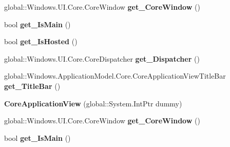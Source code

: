 \begin{DoxyCompactItemize}
global\+::\+Windows.\+U\+I.\+Core.\+Core\+Window {\bfseries get\+\_\+\+Core\+Window} ()
\item 
\mbox{\label{class_windows_1_1_application_model_1_1_core_1_1_core_application_view_ae303c87bc500fe45edef23e4dea23518}} 
bool {\bfseries get\+\_\+\+Is\+Main} ()
\item 
\mbox{\label{class_windows_1_1_application_model_1_1_core_1_1_core_application_view_a8dc7e59605e7f56708e128508f7cc977}} 
bool {\bfseries get\+\_\+\+Is\+Hosted} ()
\item 
\mbox{\label{class_windows_1_1_application_model_1_1_core_1_1_core_application_view_a9d7c8b64ee6c13bc8a8e92f9e48c4ccc}} 
global\+::\+Windows.\+U\+I.\+Core.\+Core\+Dispatcher {\bfseries get\+\_\+\+Dispatcher} ()
\item 
\mbox{\label{class_windows_1_1_application_model_1_1_core_1_1_core_application_view_a3019f6ab113ca8bc442c591f5cb35e5d}} 
global\+::\+Windows.\+Application\+Model.\+Core.\+Core\+Application\+View\+Title\+Bar {\bfseries get\+\_\+\+Title\+Bar} ()
\item 
\mbox{\label{class_windows_1_1_application_model_1_1_core_1_1_core_application_view_a7f2958bb867e52abb737c302fe562838}} 
{\bfseries Core\+Application\+View} (global\+::\+System.\+Int\+Ptr dummy)
\item 
\mbox{\label{class_windows_1_1_application_model_1_1_core_1_1_core_application_view_a7cfe4f4a49ed78d0ae11a16e6cebc507}} 
global\+::\+Windows.\+U\+I.\+Core.\+Core\+Window {\bfseries get\+\_\+\+Core\+Window} ()
\item 
\mbox{\label{class_windows_1_1_application_model_1_1_core_1_1_core_application_view_ae303c87bc500fe45edef23e4dea23518}} 
bool {\bfseries get\+\_\+\+Is\+Main} ()
\item 

\end{DoxyCompactItemize}
